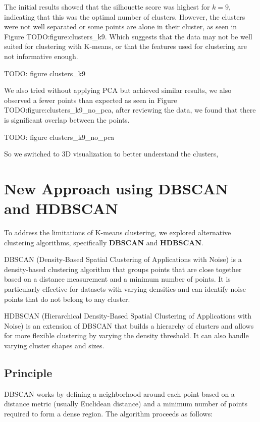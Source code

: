 The initial results showed that the silhouette score was highest for $k=9$, indicating that this was the optimal number of clusters.
However, the clusters were not well separated or some points are alone in their cluster, as seen in Figure {TODO:figure:clusters_k9}.
Which suggests that the data may not be well suited for clustering with K-means, or that the features used for clustering are not
informative enough.

TODO: figure clusters_k9

We also tried without applying PCA but achieved similar results, we also observed a fewer points than expected as seen in
Figure {TODO:figure:clusters_k9_no_pca}, after reviewing the data, we found that there is significant overlap between the points.

TODO: figure clusters_k9_no_pca

So we switched to 3D visualization to better understand the clusters,

\section{New Approach using DBSCAN and HDBSCAN}
\label{subsec:new_approach_dbscan_hdbscan}

To address the limitations of K-means clustering, we explored alternative clustering algorithms, specifically
\textbf{DBSCAN} and \textbf{HDBSCAN}.

DBSCAN (Density-Based Spatial Clustering of Applications with Noise) is a density-based clustering algorithm that
groups points that are close together based on a distance measurement and a minimum number of points. It is particularly
effective for datasets with varying densities and can identify noise points that do not belong to any cluster.

HDBSCAN (Hierarchical Density-Based Spatial Clustering of Applications with Noise) is an extension of DBSCAN that builds
a hierarchy of clusters and allows for more flexible clustering by varying the density threshold. It can also handle varying
cluster shapes and sizes.

\subsection{Principle}
\label{subsec:principle_dbscan_hdbscan}

\label{subsubsec:dbscan}

DBSCAN works by defining a neighborhood around each point based on a distance metric (usually Euclidean distance) and a
minimum number of points required to form a dense region. The algorithm proceeds as follows:

